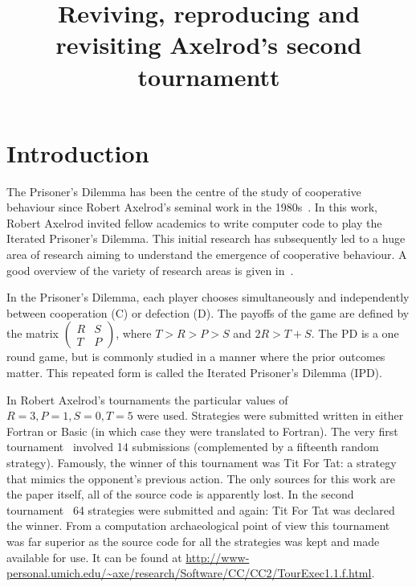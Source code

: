 \documentclass{article}
\title{Reviving, reproducing and revisiting Axelrod's second tournamentt}
\begin{document}
\maketitle

\section{Introduction}\label{sec:introduction}

The Prisoner's Dilemma has been the centre of the study of
cooperative behaviour since Robert Axelrod's seminal work in the
1980s~\cite{Axelrod1980a, Axelrod1980b, Axelrodbook}. In this work, Robert
Axelrod invited fellow academics to write computer code to play the Iterated
Prisoner's Dilemma. This initial research has subsequently led to a huge area
of research aiming to understand the emergence of cooperative behaviour. A good
overview of the variety of research areas is given in~\cite{Nowak2006}.

In the Prisoner's Dilemma, each player chooses
simultaneously and independently
between cooperation (C) or defection (D). The payoffs of
the game are defined by the matrix
\(
\begin{pmatrix}
    R & S \\ 
    T & P
\end{pmatrix}
\),
where $T > R > P > S$ and $2R > T + S$. The PD is a one
round game, but is commonly studied in a manner where the prior outcomes
matter. This repeated form is called the Iterated Prisoner's
Dilemma (IPD).


In Robert Axelrod's tournaments the particular values of \(R=3, P=1, S=0, T=5\)
were used.  Strategies were submitted written in either Fortran or Basic
(in which case they were translated to Fortran). The very first
tournament~\cite{Axelrod1980a} involved 14 submissions  (complemented by a
fifteenth random strategy). Famously, the winner of this tournament was
Tit For Tat: a strategy that mimics the opponent's previous action. The only
sources for this work are the paper itself, all of the source code is apparently
lost. In the second tournament~\cite{Axelrod1980b} 64 strategies were submitted
and again: Tit For Tat was declared the winner. From a computation archaeological
point of view this tournament was far superior as the source code for all the strategies was
kept and made available for use. It can be found at
\url{http://www-personal.umich.edu/~axe/research/Software/CC/CC2/TourExec1.1.f.html}.
\end{document}
